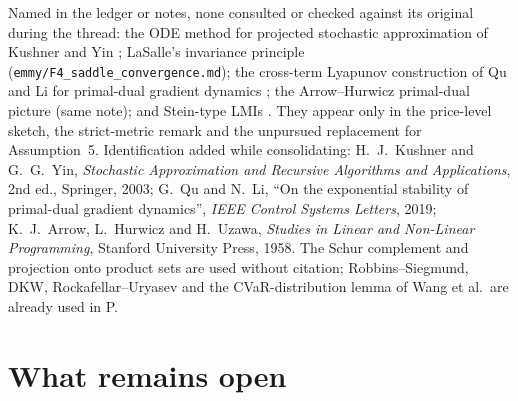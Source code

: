 \documentclass{article}
\begin{document}
Named in the ledger or notes, none consulted or checked against its original during the thread: the ODE method for projected stochastic approximation of Kushner and Yin ; LaSalle's invariance principle (\texttt{emmy/F4\_saddle\_convergence.md}); the cross-term Lyapunov construction of Qu and Li for primal-dual gradient dynamics ; the Arrow--Hurwicz primal-dual picture (same note); and Stein-type LMIs . They appear only in the price-level sketch, the strict-metric remark and the unpursued replacement for Assumption~5. Identification added while consolidating: H.~J.~Kushner and G.~G.~Yin, \emph{Stochastic Approximation and Recursive Algorithms and Applications}, 2nd ed., Springer, 2003; G.~Qu and N.~Li, ``On the exponential stability of primal-dual gradient dynamics'', \emph{IEEE Control Systems Letters}, 2019; K.~J.~Arrow, L.~Hurwicz and H.~Uzawa, \emph{Studies in Linear and Non-Linear Programming}, Stanford University Press, 1958. The Schur complement and projection onto product sets are used without citation; Robbins--Siegmund, DKW, Rockafellar--Uryasev and the CVaR-distribution lemma of Wang et al.\ are already used in P.

\section{What remains open}
\end{document}
